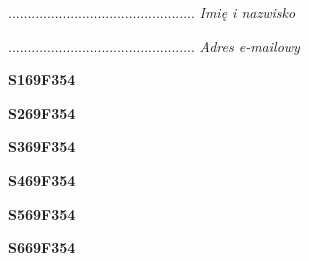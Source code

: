 \begin{turn}{90}\begin{minipage}{\linewidth} \vspace{20mm} ................................................  \textit{Imię i nazwisko}\end{minipage}\end{turn}

\begin{turn}{90}\begin{minipage}{\linewidth} \vspace{20mm} ................................................  \textit{Adres e-mailowy}\end{minipage}\end{turn}

\begin{turn}{90}\huge \begin{minipage}{\linewidth} \vspace{10mm}\textbf{S169F354}\end{minipage}\end{turn}

\begin{turn}{90}\huge \begin{minipage}{\linewidth} \vspace{10mm}\textbf{S269F354}\end{minipage}\end{turn}

\begin{turn}{90}\huge \begin{minipage}{\linewidth} \vspace{10mm}\textbf{S369F354}\end{minipage}\end{turn}

\begin{turn}{90}\huge \begin{minipage}{\linewidth} \vspace{10mm}\textbf{S469F354}\end{minipage}\end{turn}

\begin{turn}{90}\huge \begin{minipage}{\linewidth} \vspace{10mm}\textbf{S569F354}\end{minipage}\end{turn}

\begin{turn}{90}\huge \begin{minipage}{\linewidth} \vspace{10mm}\textbf{S669F354}\end{minipage}\end{turn}


